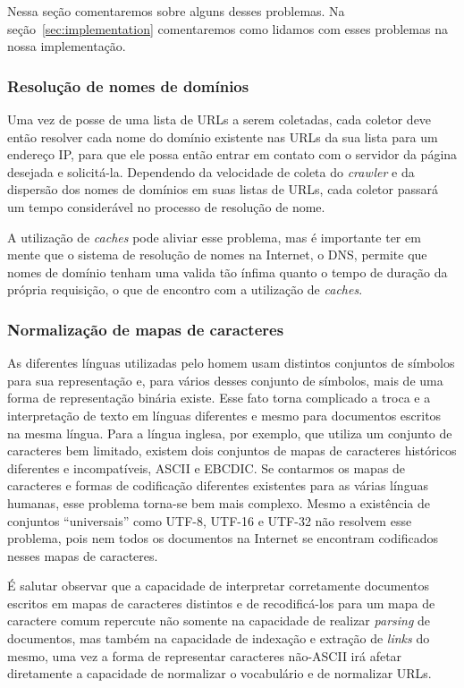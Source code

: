 \documentclass[10pt,twocolumn]{article}
\begin{document}
Nessa seção comentaremos sobre alguns desses problemas. Na
seção~\ref{sec:implementation} comentaremos como lidamos com esses
problemas na nossa implementação.

\subsubsection{Resolução de nomes de domínios}\label{prob:dns}
Uma vez de posse de uma lista de URLs a serem coletadas, cada coletor
deve então resolver cada nome do domínio existente nas URLs da sua lista
para um endereço IP, para que ele possa então entrar em contato com o
servidor da página desejada e solicitá-la. Dependendo da velocidade de
coleta do \emph{crawler} e da dispersão dos nomes de domínios em suas
listas de URLs, cada coletor passará um tempo considerável no processo de
resolução de nome.

A utilização de \emph{caches} pode aliviar esse problema, mas é
importante ter em mente que o sistema de resolução de nomes na Internet,
o DNS, permite que nomes de domínio tenham uma valida tão ínfima quanto
o tempo de duração da própria requisição, o que de encontro com a
utilização de \emph{caches}.

\subsubsection{Normalização de mapas de
caracteres}\label{prob:charmapnorm}

As diferentes línguas utilizadas pelo homem usam distintos conjuntos de
símbolos para sua representação e, para vários desses conjunto de
símbolos, mais de uma forma de representação binária existe. Esse fato
torna complicado a troca e a interpretação de texto em línguas diferentes
e mesmo para documentos escritos na mesma língua. Para a língua inglesa,
por exemplo, que utiliza um conjunto de caracteres bem limitado, existem
dois conjuntos de mapas de caracteres históricos diferentes e
incompatíveis, ASCII e EBCDIC. Se contarmos os mapas de caracteres e
formas de codificação diferentes existentes para as várias línguas
humanas, esse problema torna-se bem mais complexo.
Mesmo a existência de conjuntos ``universais'' como UTF-8, UTF-16 e
UTF-32 não resolvem esse problema, pois nem todos os documentos na
Internet se encontram codificados nesses mapas de caracteres.

É salutar observar que a capacidade de interpretar corretamente
documentos escritos em mapas de caracteres distintos e de recodificá-los
para um mapa de caractere comum  repercute não somente na capacidade de
realizar \emph{parsing} de documentos, mas também na capacidade de
indexação e extração de \emph{links} do mesmo, uma vez a forma de
representar caracteres não-ASCII irá afetar diretamente a capacidade de
normalizar o vocabulário e de normalizar URLs.
\end{document}
